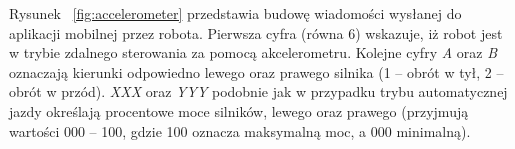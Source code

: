 Rysunek ~\ref{fig:accelerometer} przedstawia budowę wiadomości wysłanej do aplikacji mobilnej przez robota. Pierwsza cyfra (równa 6) wskazuje, iż robot jest w trybie zdalnego sterowania za pomocą akcelerometru. Kolejne cyfry \textit{A} oraz \textit{B} oznaczają kierunki odpowiedno lewego oraz prawego silnika (1 – obrót w tył, 2 – obrót w przód). \textit{XXX} oraz \textit{YYY} podobnie jak w przypadku trybu automatycznej jazdy określają procentowe moce silników, lewego oraz prawego (przyjmują wartości 000 – 100, gdzie 100 oznacza maksymalną moc, a 000 minimalną).  

